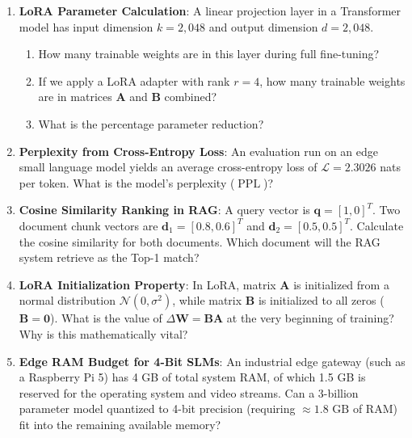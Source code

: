\begin{checkyourself}
\begin{enumerate}
    \item \textbf{LoRA Parameter Calculation}: A linear projection layer in a Transformer model has input dimension $k = 2{,}048$ and output dimension $d = 2{,}048$.
    \begin{enumerate}[label=(\alph*)]
        \item How many trainable weights are in this layer during full fine-tuning?
        \item If we apply a LoRA adapter with rank $r = 4$, how many trainable weights are in matrices $\mathbf{A}$ and $\mathbf{B}$ combined?
        \item What is the percentage parameter reduction?
    \end{enumerate}
    \item \textbf{Perplexity from Cross-Entropy Loss}: An evaluation run on an edge small language model yields an average cross-entropy loss of $\mathcal{L} = 2.3026$ nats per token. What is the model's perplexity ($\operatorname{PPL}$)?
    \item \textbf{Cosine Similarity Ranking in RAG}: A query vector is $\mathbf{q} = [1, 0]^T$. Two document chunk vectors are $\mathbf{d}_1 = [0.8, 0.6]^T$ and $\mathbf{d}_2 = [0.5, 0.5]^T$. Calculate the cosine similarity for both documents. Which document will the RAG system retrieve as the Top-1 match?
    \item \textbf{LoRA Initialization Property}: In LoRA, matrix $\mathbf{A}$ is initialized from a normal distribution $\mathcal{N}(0, \sigma^2)$, while matrix $\mathbf{B}$ is initialized to all zeros ($\mathbf{B} = \mathbf{0}$). What is the value of $\Delta \mathbf{W} = \mathbf{B}\mathbf{A}$ at the very beginning of training? Why is this mathematically vital?
    \item \textbf{Edge RAM Budget for 4-Bit SLMs}: An industrial edge gateway (such as a Raspberry Pi 5) has 4 GB of total system RAM, of which 1.5 GB is reserved for the operating system and video streams. Can a 3-billion parameter model quantized to 4-bit precision (requiring $\approx 1.8\text{ GB}$ of RAM) fit into the remaining available memory?
\end{enumerate}
\end{checkyourself}

